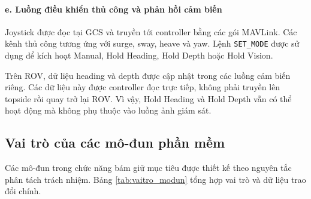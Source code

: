\documentclass[../DoAn.tex]{subfiles}
\begin{document}
\paragraph{e. Luồng điều khiển thủ công và phản hồi cảm biến}
Joystick được đọc tại GCS và truyền tới controller bằng các gói MAVLink. Các kênh thủ công tương ứng với surge, sway, heave và yaw. Lệnh \texttt{SET\_MODE} được sử dụng để kích hoạt Manual, Hold Heading, Hold Depth hoặc Hold Vision.

Trên ROV, dữ liệu heading và depth được cập nhật trong các luồng cảm biến riêng. Các dữ liệu này được controller đọc trực tiếp, không phải truyền lên topside rồi quay trở lại ROV. Vì vậy, Hold Heading và Hold Depth vẫn có thể hoạt động mà không phụ thuộc vào luồng ảnh giám sát.

\subsection{Vai trò của các mô-đun phần mềm}

Các mô-đun trong chức năng bám giữ mục tiêu được thiết kế theo nguyên tắc phân tách trách nhiệm. Bảng \ref{tab:vaitro_modun} tổng hợp vai trò và dữ liệu trao đổi chính.
\end{document}
